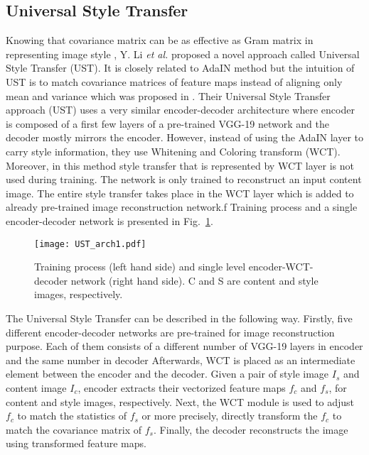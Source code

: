 \documentclass{llncs}
\begin{document}
\subsection{Universal Style Transfer}
%
Knowing that covariance matrix can be as effective as Gram matrix in representing image style \cite{cov:gram}, Y. Li \textit{et al.} \cite{universal:style} proposed a novel approach called Universal Style Transfer (UST). It is closely related to AdaIN method but the intuition of UST is to match covariance matrices of feature maps instead of aligning only mean and variance which was proposed in \cite{huang:belongie}. Their Universal Style Transfer approach (UST) uses a very similar encoder-decoder architecture where encoder is composed of a first few layers of a pre-trained VGG-19 network and the decoder mostly mirrors the encoder. However, instead of using the AdaIN layer to carry style information, they use Whitening and Coloring transform (WCT). Moreover, in this method style transfer that is represented by WCT layer is not used during training. The network is only trained to reconstruct an input content image. The entire style transfer takes place in the WCT layer which is added to already pre-trained image reconstruction network.f Training process and a single encoder-decoder network is presented in Fig.~\ref{ust:arch1}.

\begin{figure}[H]
  \centering
  \texttt{[image: UST\_arch1.pdf]}
  \caption{Training process (left hand side) and single level encoder-WCT-decoder network (right hand side). C and S are content and style images, respectively. \label{ust:arch1}}
\end{figure}

The Universal Style Transfer can be described in the following way. Firstly, five different encoder-decoder networks are pre-trained for image reconstruction purpose. Each of them consists of a different number of VGG-19 layers in encoder and the same number in decoder %
Afterwards, WCT is placed as an intermediate element between the encoder and the decoder. Given a pair of style image $I_s$ and content image $I_c$, encoder extracts their vectorized feature maps $f_c$ and $f_s$, for content and style images, respectively. Next, the WCT module is used to adjust $f_c$ to match the statistics of $f_s$ or more precisely, directly transform the $f_c$ to match the covariance matrix of $f_s$. Finally, the decoder reconstructs the image using transformed feature maps.
\end{document}
